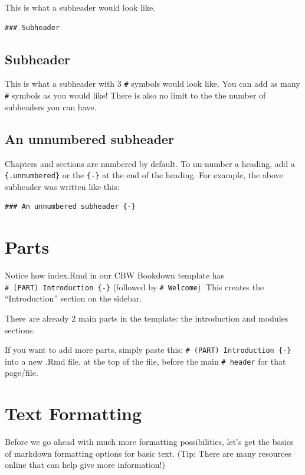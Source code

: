 \documentclass[
]{book}
\theoremstyle{definition}
\theoremstyle{definition}
\theoremstyle{definition}
\theoremstyle{definition}
\theoremstyle{remark}
\begin{document}
This is what a subheader would look like.

\begin{verbatim}
### Subheader
\end{verbatim}

\subsection{Subheader}\label{subheader-1}

This is what a subheader with 3 \texttt{\#} symbols would look like. You can add as many \texttt{\#} symbols as you would like! There is also no limit to the the number of subheaders you can have.

\subsection*{An unnumbered subheader}\label{an-unnumbered-subheader}

Chapters and sections are numbered by default. To un-number a heading, add a \texttt{\{.unnumbered\}} or the \texttt{\{-\}} at the end of the heading. For example, the above subheader was written like this:

\begin{verbatim}
### An unnumbered subheader {-}
\end{verbatim}

\section{Parts}\label{parts}

Notice how index.Rmd in our CBW Bookdown template has \texttt{\#\ (PART)\ Introduction\ \{-\}} (followed by \texttt{\#\ Welcome}). This creates the ``Introduction'' section on the sidebar.

There are already 2 main parts in the template: the introduction and modules sections.

If you want to add more parts, simply paste this: \texttt{\#\ (PART)\ Introduction\ \{-\}} into a new .Rmd file, at the top of the file, before the main \texttt{\#\ header} for that page/file.

\section{Text Formatting}\label{text-formatting}

Before we go ahead with much more formatting possibilities, let's get the basics of markdown formatting options for basic text. (Tip: There are many resources online that can help give more information!)
\end{document}
